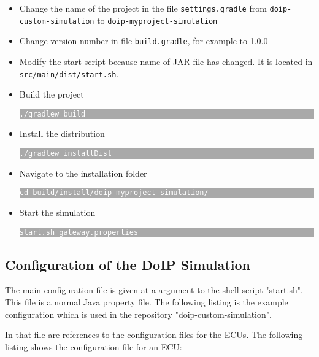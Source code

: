 \documentclass[a4paper]{article}
\newcommand{\code}[1]{\texttt{#1}}
\newcommand{\terminal}[1]{

\colorbox{darkgray}{\parbox{\linewidth}{\texttt{\textcolor{white}{\footnotesize{#1}}}}}

}
\begin{document}
\begin{itemize}
			\item Change the name of the project in the file 
			\code{settings.gradle} from
			\code{doip-custom-simulation} to \code{doip-myproject-simulation}

			\item Change version number in file 
			\code{build.gradle}, for example to 1.0.0

			\item Modify the start script because name of JAR file has changed.
			It is located in \code{src/main/dist/start.sh}.

			\item Build the project

			\terminal{./gradlew build}

			\item Install the distribution

			\terminal{./gradlew installDist}

			\item Navigate to the installation folder

			\terminal{cd build/install/doip-myproject-simulation/}

			\item Start the simulation

			\terminal{start.sh gateway.properties}

		\end{itemize}

	\subsection{Configuration of the DoIP Simulation}
		
		The main configuration file is given at a argument to the shell script
		"start.sh". This file is a normal Java property file. The following 
		listing is the example configuration which is used in the repository
		"doip-custom-simulation".

		

		In that file are references to the configuration files for the ECUs.
		The following listing shows the configuration file for an ECU:

		
\end{document}
